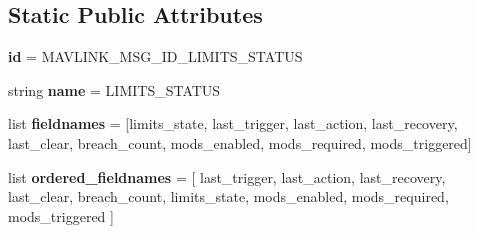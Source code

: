 \subsection*{Static Public Attributes}
\begin{DoxyCompactItemize}
\item 
\mbox{\label{classpymavlink_1_1dialects_1_1v10_1_1MAVLink__limits__status__message_a0ffb687eaa1caaebc706e183a003f563}} 
{\bfseries id} = M\+A\+V\+L\+I\+N\+K\+\_\+\+M\+S\+G\+\_\+\+I\+D\+\_\+\+L\+I\+M\+I\+T\+S\+\_\+\+S\+T\+A\+T\+US
\item 
\mbox{\label{classpymavlink_1_1dialects_1_1v10_1_1MAVLink__limits__status__message_ac6cafac8cdf33db51f4ce942a6439292}} 
string {\bfseries name} = \textquotesingle{}L\+I\+M\+I\+T\+S\+\_\+\+S\+T\+A\+T\+US\textquotesingle{}
\item 
\mbox{\label{classpymavlink_1_1dialects_1_1v10_1_1MAVLink__limits__status__message_aef763bc791d0a062431707a4d5e611b3}} 
list {\bfseries fieldnames} = \mbox{[}\textquotesingle{}limits\+\_\+state\textquotesingle{}, \textquotesingle{}last\+\_\+trigger\textquotesingle{}, \textquotesingle{}last\+\_\+action\textquotesingle{}, \textquotesingle{}last\+\_\+recovery\textquotesingle{}, \textquotesingle{}last\+\_\+clear\textquotesingle{}, \textquotesingle{}breach\+\_\+count\textquotesingle{}, \textquotesingle{}mods\+\_\+enabled\textquotesingle{}, \textquotesingle{}mods\+\_\+required\textquotesingle{}, \textquotesingle{}mods\+\_\+triggered\textquotesingle{}\mbox{]}
\item 
\mbox{\label{classpymavlink_1_1dialects_1_1v10_1_1MAVLink__limits__status__message_aa0154816b0a23cd311e615dc9ca43acc}} 
list {\bfseries ordered\+\_\+fieldnames} = \mbox{[} \textquotesingle{}last\+\_\+trigger\textquotesingle{}, \textquotesingle{}last\+\_\+action\textquotesingle{}, \textquotesingle{}last\+\_\+recovery\textquotesingle{}, \textquotesingle{}last\+\_\+clear\textquotesingle{}, \textquotesingle{}breach\+\_\+count\textquotesingle{}, \textquotesingle{}limits\+\_\+state\textquotesingle{}, \textquotesingle{}mods\+\_\+enabled\textquotesingle{}, \textquotesingle{}mods\+\_\+required\textquotesingle{}, \textquotesingle{}mods\+\_\+triggered\textquotesingle{} \mbox{]}

\end{DoxyCompactItemize}
